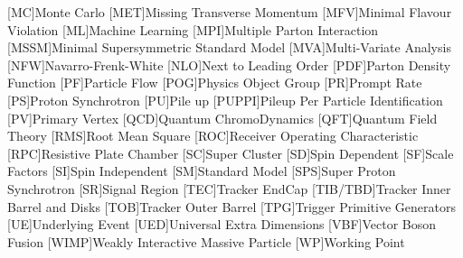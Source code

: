 \documentclass[a4paper, 10pt, openright]{report}
\begin{document}
\begin{multicols}{2}
\begin{acronym}
[MC]{Monte Carlo}
[MET]{Missing Transverse Momentum}
[MFV]{Minimal Flavour Violation}
[ML]{Machine Learning}
[MPI]{Multiple Parton Interaction}
[MSSM]{Minimal Supersymmetric Standard Model}
[MVA]{Multi-Variate Analysis}
[NFW]{Navarro-Frenk-White}
[NLO]{Next to Leading Order}
[PDF]{Parton Density Function}
[PF]{Particle Flow}
[POG]{Physics Object Group}
[PR]{Prompt Rate}
[PS]{Proton Synchrotron}
[PU]{Pile up}
[PUPPI]{Pileup Per Particle Identification}
[PV]{Primary Vertex}
[QCD]{Quantum ChromoDynamics}
[QFT]{Quantum Field Theory}
[RMS]{Root Mean Square}
[ROC]{Receiver Operating Characteristic}
[RPC]{Resistive Plate Chamber}
[SC]{Super Cluster}
[SD]{Spin Dependent}
[SF]{Scale Factors}
[SI]{Spin Independent}
[SM]{Standard Model}
[SPS]{Super Proton Synchrotron}
[SR]{Signal Region}
[TEC]{Tracker EndCap} 
[TIB/TBD]{Tracker Inner Barrel and Disks}
[TOB]{Tracker Outer Barrel}
[TPG]{Trigger Primitive Generators}
[UE]{Underlying Event}
[UED]{Universal Extra Dimensions}
[VBF]{Vector Boson Fusion}
[WIMP]{Weakly Interactive Massive Particle}
[WP]{Working Point}

\end{acronym}
\end{multicols}

\newpage

\baselineskip
\tableofcontents
{}\baselineskip

\thispagestyle{empty}
\newpage


\clearpage
\thispagestyle{empty}
\phantom{a}
\vfill
\newpage

\setlength{\parskip}{8pt}


\pagestyle{fancy}
\fancyhf{}
\fancyhead[EL]{\vspace{20pt} \thepage \hfill \nouppercase\leftmark \vspace{4pt}}
\fancyhead[OL]{\vspace{20pt} \thepage \hfill \nouppercase\rightmark \vspace{4pt}}
\end{document}
